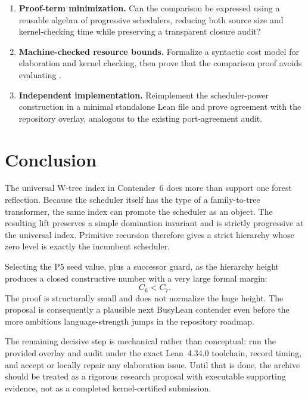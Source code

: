 \documentclass[11pt]{article}
\theoremstyle{definition}
\theoremstyle{remark}
\newcommand{\lean}[1]{\texttt{\detokenize{#1}}}
\begin{document}
\begin{enumerate}[leftmargin=*,label=\textbf{R\arabic*.}]
\item \textbf{Proof-term minimization.} Can the comparison be expressed using a
      reusable algebra of progressive schedulers, reducing both source size and
      kernel-checking time while preserving a transparent closure audit?

\item \textbf{Machine-checked resource bounds.} Formalize a syntactic cost model
      for elaboration and kernel checking, then prove that the comparison proof
      avoids evaluating \lean{p5Family 0 42}.

\item \textbf{Independent implementation.} Reimplement the scheduler-power
      construction in a minimal standalone Lean file and prove agreement with
      the repository overlay, analogous to the existing port-agreement audit.
\end{enumerate}

\section{Conclusion}

The universal W-tree index in Contender~6 does more than support one forest
reflection.  Because the scheduler itself has the type of a family-to-tree
transformer, the same index can promote the scheduler as an object.  The
resulting lift preserves a simple domination invariant and is strictly
progressive at the universal index.  Primitive recursion therefore gives a
strict hierarchy whose zero level is exactly the incumbent scheduler.

Selecting the P5 seed value, plus a successor guard, as the hierarchy height
produces a closed constructive number with a very large formal margin:
\[
 C_6<C_7.
\]
The proof is structurally small and does not normalize the huge height.  The
proposal is consequently a plausible next BusyLean contender even before the
more ambitious language-strength jumps in the repository roadmap.

The remaining decisive step is mechanical rather than conceptual: run the
provided overlay and audit under the exact Lean~4.34.0 toolchain, record timing,
and accept or locally repair any elaboration issue.  Until that is done, the
archive should be treated as a rigorous research proposal with executable
supporting evidence, not as a completed kernel-certified submission.

\appendix
\end{document}
